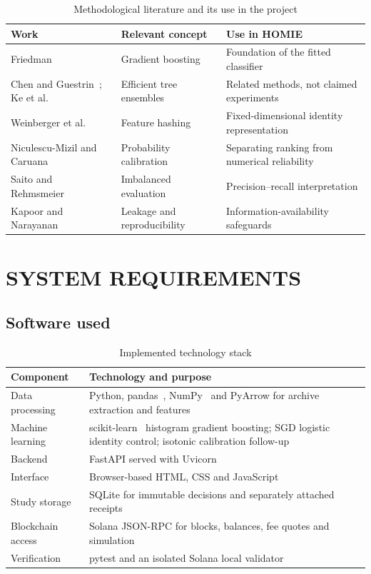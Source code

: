 \documentclass[12pt,a4paper,oneside]{report}
\begin{document}
\begin{table}[htbp]\centering\caption{Methodological literature and its use in the project}
\small\begin{tabularx}{\textwidth}{p{30mm}YY}\toprule Work&Relevant concept&Use in HOMIE\\\midrule
Friedman~\cite{friedman}&Gradient boosting&Foundation of the fitted classifier\\
Chen and Guestrin~\cite{xgboost}; Ke et al.~\cite{lightgbm}&Efficient tree ensembles&Related methods, not claimed experiments\\
Weinberger et al.~\cite{hashing}&Feature hashing&Fixed-dimensional identity representation\\
Niculescu-Mizil and Caruana~\cite{niculescu}&Probability calibration&Separating ranking from numerical reliability\\
Saito and Rehmsmeier~\cite{saito}&Imbalanced evaluation&Precision--recall interpretation\\
Kapoor and Narayanan~\cite{leakage}&Leakage and reproducibility&Information-availability safeguards\\\bottomrule\end{tabularx}\end{table}

\chapter{SYSTEM REQUIREMENTS}
\section{Software used}
\begin{table}[ht]\centering\caption{Implemented technology stack}
\begin{tabularx}{\textwidth}{p{38mm}Y}\toprule Component&Technology and purpose\\\midrule
Data processing&Python, pandas~\cite{pandas}, NumPy~\cite{numpy} and PyArrow for archive extraction and features\\
Machine learning&scikit-learn~\cite{sklearn} histogram gradient boosting; SGD logistic identity control; isotonic calibration follow-up\\
Backend&FastAPI served with Uvicorn\\
Interface&Browser-based HTML, CSS and JavaScript\\
Study storage&SQLite for immutable decisions and separately attached receipts\\
Blockchain access&Solana JSON-RPC for blocks, balances, fee quotes and simulation\\
Verification&pytest and an isolated Solana local validator\\\bottomrule\end{tabularx}\end{table}
\end{document}
